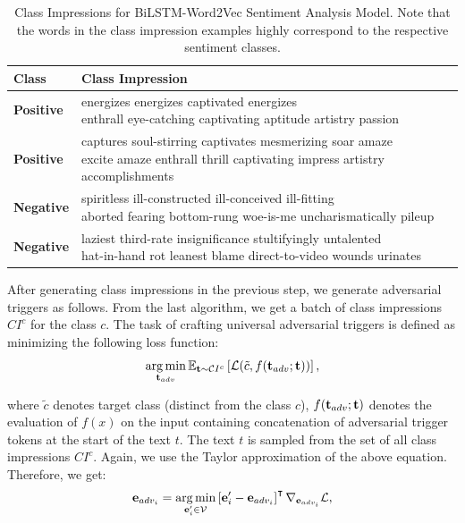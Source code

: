\begin{table}[!htbp]
{
\begin{adjustbox}{width=\textwidth}

\begin{tabular}{|l||l|}
\hline
\textbf{Class} & \textbf{Class Impression} \\ \hline
  {\bf Positive} & \makecell{energizes energizes captivated energizes\\enthrall eye-catching captivating aptitude artistry passion}\\ \hline
  {\bf Positive} & \makecell{captures soul-stirring captivates mesmerizing soar amaze\\excite amaze enthrall thrill captivating impress artistry accomplishments}\\ \hline
  {\bf Negative} & \makecell{spiritless ill-constructed ill-conceived ill-fitting\\aborted fearing bottom-rung woe-is-me uncharismatically pileup}\\ \hline
  {\bf Negative} & \makecell{laziest third-rate insignificance stultifyingly untalented\\hat-in-hand rot leanest blame direct-to-video wounds urinates}\\ \hline
 
\end{tabular}
\end{adjustbox}

}
\caption{\label{table:SST-GLOVE-CI} \small Class Impressions for BiLSTM-Word2Vec Sentiment Analysis  Model. Note that the words in the class impression examples highly correspond to the respective sentiment classes.}
\end{table}

After generating class impressions in the previous step, we generate adversarial triggers as follows. From the last algorithm, we get a batch of class impressions $CI^c$ for the class $c$. The task of crafting universal adversarial triggers is defined as minimizing the following loss function:
\begin{equation}\label{eq:uat}
\argmin_{\mb{t}_{adv}} \mathbb{E}_{\mb{t} \sim \mathcal CI^c}\left[\loss(\tilde{c}, f(\mb{t}_{adv}; \mb{t})) \right],
\end{equation}

\noindent where $\tilde{c}$ denotes target class (distinct from the class $c$), $f(\boldsymbol{\mathbf{t}}_{adv}; \boldsymbol{\mathbf{t}})$ denotes the evaluation of $f(x)$ on the input containing concatenation of adversarial trigger tokens at the start of the text $t$. The text $t$ is sampled from the set of all class impressions $CI^c$. Again, we use the Taylor approximation of the above equation. Therefore, we get:
\begin{equation}\label{eq:uat taylor}
 \mb{e}_{adv_i} = \argmin_{\mb{e}_i^\prime \in \mathcal V}\left[\mb{e}_i^\prime-{\mb{e}_{adv_i}}\right]^\intercal\nabla_{\mb{e}_{adv_i}}\loss,
\end{equation}

